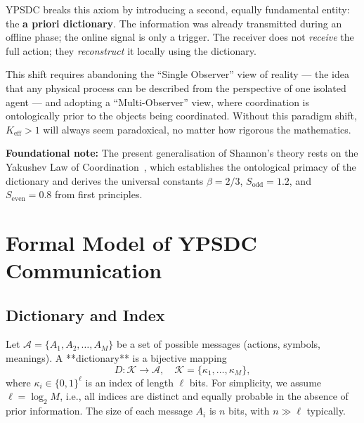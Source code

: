 \documentclass[12pt,a4paper]{article}
\theoremstyle{remark}
\begin{document}
	YPSDC breaks this axiom by introducing a second, equally
	fundamental entity: the \textbf{a priori dictionary}. The
	information was already transmitted during an offline phase;
	the online signal is only a trigger. The receiver does not
	\emph{receive} the full action; they \emph{reconstruct} it
	locally using the dictionary.
	
	This shift requires abandoning the ``Single Observer'' view of
	reality --- the idea that any physical process can be described
	from the perspective of one isolated agent --- and adopting a
	``Multi-Observer'' view, where coordination is ontologically
	prior to the objects being coordinated. Without this
	paradigm shift, \(K_{\mathrm{eff}} > 1\) will always seem
	paradoxical, no matter how rigorous the mathematics.
	
	\medskip
	
	\textbf{Foundational note:} The present generalisation of Shannon's theory
	rests on the Yakushev Law of Coordination~\cite{YakushevLaw2026}, which
	establishes the ontological primacy of the dictionary and derives the
	universal constants \(\beta = 2/3\), \(S_{\mathrm{odd}} = 1.2\), and
	\(S_{\mathrm{even}} = 0.8\) from first principles.
	
	\section{Formal Model of YPSDC Communication}
	\label{sec:model}
	
	\subsection{Dictionary and Index}
	
	Let $\mathcal{A} = \{A_1, A_2, \dots, A_M\}$ be a set of possible messages (actions, symbols, meanings). A **dictionary** is a bijective mapping
	\begin{equation}
		D: \mathcal{K} \to \mathcal{A}, \quad \mathcal{K} = \{\kappa_1, \dots, \kappa_M\},
	\end{equation}
	where $\kappa_i \in \{0,1\}^\ell$ is an index of length $\ell$ bits. For simplicity, we assume $\ell = \log_2 M$, i.e., all indices are distinct and equally probable in the absence of prior information. The size of each message $A_i$ is $n$ bits, with $n \gg \ell$ typically.
	
\end{document}
